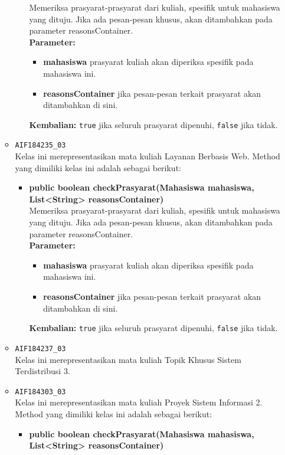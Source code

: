 \begin{enumerate}
\begin{itemize}
\begin{itemize}
			Memeriksa prasyarat-prasyarat dari kuliah, spesifik untuk mahasiswa yang dituju. Jika ada pesan-pesan khusus, akan ditambahkan pada parameter reasonsContainer.\\
			\textbf{Parameter:}
			\begin{itemize}
				\item \textbf{mahasiswa} prasyarat kuliah akan diperiksa spesifik pada mahasiswa ini.
				\item \textbf{reasonsContainer} jika pesan-pesan terkait prasyarat akan ditambahkan di sini.
			\end{itemize}
			\textbf{Kembalian:} \texttt{true} jika seluruh prasyarat dipenuhi, \texttt{false} jika tidak.
		\end{itemize}
		\item \texttt{AIF184235\_03} \\
		Kelas ini merepresentasikan mata kuliah Layanan Berbasis Web. Method yang dimiliki kelas ini adalah sebagai berikut: 
		\begin{itemize}
			\item \textbf{public boolean checkPrasyarat(Mahasiswa mahasiswa, List<String> reasonsContainer)}\\
			Memeriksa prasyarat-prasyarat dari kuliah, spesifik untuk mahasiswa yang dituju. Jika ada pesan-pesan khusus, akan ditambahkan pada parameter reasonsContainer.\\
			\textbf{Parameter:}
			\begin{itemize}
				\item \textbf{mahasiswa} prasyarat kuliah akan diperiksa spesifik pada mahasiswa ini.
				\item \textbf{reasonsContainer} jika pesan-pesan terkait prasyarat akan ditambahkan di sini.
			\end{itemize}
			\textbf{Kembalian:} \texttt{true} jika seluruh prasyarat dipenuhi, \texttt{false} jika tidak.
		\end{itemize}
		\item \texttt{AIF184237\_03} \\
		Kelas ini merepresentasikan mata kuliah Topik Khusus Sistem Terdistribusi 3.
		\item \texttt{AIF184303\_03} \\
		Kelas ini merepresentasikan mata kuliah Proyek Sistem Informasi 2. Method yang dimiliki kelas ini adalah sebagai berikut: 
		\begin{itemize}
			\item \textbf{public boolean checkPrasyarat(Mahasiswa mahasiswa, List<String> reasonsContainer)}\\

\end{itemize}
\end{itemize}
\end{enumerate}
